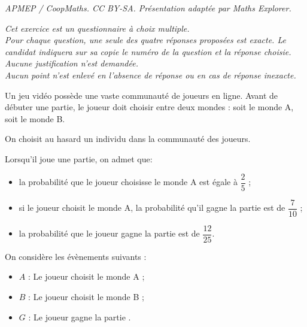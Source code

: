 \documentclass[10pt]{article}
\begin{document}
\noindent\textit{APMEP / CoopMaths. CC BY-SA. Présentation adaptée par Maths Explorer.}\par\medskip
\medskip

\emph{Cet exercice est un questionnaire à choix multiple.\\
Pour chaque question, une seule des quatre réponses proposées est exacte. Le candidat indiquera sur sa copie le numéro de la question et la réponse choisie.\\
Aucune justification n'est demandée.\\
Aucun point n'est enlevé en l'absence de réponse ou en cas de réponse inexacte.}

\bigskip

Un jeu vidéo possède une vaste communauté de joueurs en ligne. Avant de débuter une partie, le joueur doit choisir entre deux \og mondes \fg : soit le monde A, soit le monde B.

\smallskip

On choisit au hasard un individu dans la communauté des joueurs.

Lorsqu'il joue une partie, on admet que:
\begin{itemize}
\item[$\bullet~~$] la probabilité que le joueur choisisse le monde A est égale à $\dfrac25$ ;
\item[$\bullet~~$] si le joueur choisit le monde A, la probabilité qu'il gagne la partie est de $\dfrac{7}{10}$ ;
\item[$\bullet~~$] la probabilité que le joueur gagne la partie est de $\dfrac{12}{25}$.
\end{itemize}

On considère les évènements suivants : 

\begin{itemize}
\item[$\bullet~~$] $A$ : \og Le joueur choisit le monde A \fg{}; 
\item[$\bullet~~$] $B$ : \og Le joueur choisit le monde B \fg{} ;
\item[$\bullet~~$] $G$ : \og Le joueur gagne la partie \fg.
\end{itemize}

\medskip
\end{document}
